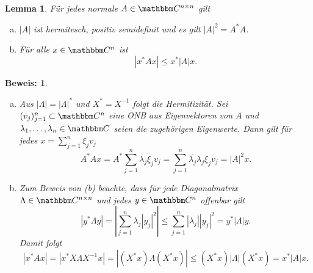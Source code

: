 \documentclass[12pt,a4paper]{book}
\theoremstyle{break}
\newtheorem{lemma}[theorem]{Lemma}
\theoremstyle{nonumberplain}
\newtheorem{beweis}{Beweis:}
\newcommand{\C}{\mathbbm C}
\newcommand{\1}{\mathbbm{1}} 			      	%
\begin{document}
\begin{lemma}\label{lemma:betrag}
Für jedes normale $A\in \C^{n\times n}$ gilt
\begin{enumerate}[(a)]
\item $|A|$ ist hermitesch, positiv semidefinit und es gilt $|A|^2=A^* A$.
\item Für alle $x\in \C^n$ ist
\[
|x^* A x | \leq x^* |A| x.
\]
\end{enumerate}
\end{lemma}
\begin{beweis}
\begin{enumerate}[(a)]
\item Aus $|\Lambda|=|\Lambda|^*$ und $X^*=X^{-1}$ folgt die Hermitizität. Sei $(v_j)_{j=1}^n\subset \C^n$ eine ONB
aus Eigenvektoren von $A$ und $\lambda_1,\ldots,\lambda_n\in \C$ seien die zugehörigen Eigenwerte.
Dann gilt für jedes $x=\sum_{j=1}^n \xi_j v_j$
\[
A^*Ax=A^* \sum_{j=1}^n \lambda_j \xi_j v_j=\sum_{j=1}^n \overline{\lambda_j} \lambda_j \xi_j v_j= |A|^2 x.
\] 


%
\item Zum Beweis von (b) beachte, dass für jede Diagonalmatrix $\Lambda\in \C^{n\times n}$ und jedes
$y\in \C^n$ offenbar gilt
\[
|y^* \Lambda y|=\left| \sum_{j=1}^n \lambda_j |y_j|^2\right| \leq \sum_{j=1}^n |\lambda_j| |y_j|^2 = y^* |\Lambda| y.
\]
Damit folgt 
\[
|x^* A x | = | x^* X \Lambda X^{-1} x | = | (X^*x) \Lambda (X^* x)| \leq (X^* x) |\Lambda| (X^* x) =  x^* |A| x.
\]
\end{enumerate}
\end{beweis}
\end{document}
